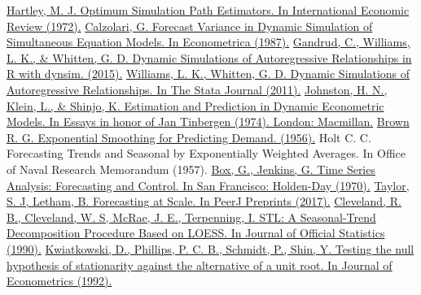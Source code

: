 \documentclass[a4paper,14pt]{extarticle}
\begin{document}
\begin{thebibliography}{99}
	\hypertarget{hartley72}{}
	\href{https://www.jstor.org/stable/2525851}
	{Hartley, M. J. Optimum Simulation Path Estimators. In International Economic Review (1972).}
	\hypertarget{calzolari87}{}
	\href{https://www.jstor.org/stable/1913569}
	{Calzolari, G. Forecast Variance in Dynamic Simulation of Simultaneous Equation Models. In Econometrica (1987).}
	\hypertarget{gandrud15}{}
	\href{https://mran.microsoft.com/snapshot/2015-11-17/web/packages/dynsim/vignettes/dynsim-overview.pdf}
	{Gandrud, C., Williams, L. K., \& Whitten, G. D. Dynamic Simulations of Autoregressive Relationships in R with dynsim. (2015).}
	\hypertarget{williams11}{}
	\href{http://web.missouri.edu/~williamslaro/Dynamic%20Simulations--Stata%20Journal.pdf}
	{Williams, L. K., Whitten, G. D. Dynamic Simulations of Autoregressive Relationships. In The Stata Journal (2011).}
	\hypertarget{johnston74}{}
	\href{https://link.springer.com/chapter/10.1007/978-1-349-01936-6_2}
	{Johnston, H. N., Klein, L., \& Shinjo, K. Estimation and Prediction in Dynamic Econometric Models. In Essays in honor of Jan Tinbergen (1974). London: Macmillan.}
	\hypertarget{brown56}{}
	\href{http://legacy.library.ucsf.edu/tid/dae94e00;jsessionid=104A0CEFFA31ADC2FA5E0558F69B3E1D.tobacco03}
	{Brown R. G. Exponential Smoothing for Predicting Demand. (1956).}
	\hypertarget{holt57}{}
	{Holt C. C. Forecasting Trends and Seasonal by Exponentially Weighted Averages. In Office of Naval Research Memorandum (1957).}
	\hypertarget{box70}{}
	\href{https://books.google.ru/books?hl=en&lr=&id=rNt5CgAAQBAJ&oi=fnd&pg=PR7&dq=Box+Jenkins+time+series+analysis+forecasting+and+control&ots=DK52vUm_Vz&sig=niRC2Tt2tUbjb6GQVpyfw2huG6U&redir_esc=y#v=onepage&q=Box%20Jenkins%20time%20series%20analysis%20forecasting%20and%20control&f=false}
	{Box, G., Jenkins, G. Time Series Analysis: Forecasting and Control. In San Francisco: Holden-Day (1970).}
	\hypertarget{taylor17}{}
	\href{https://peerj.com/preprints/3190/}
	{Taylor, S. J, Letham, B. Forecasting at Scale. In PeerJ Preprints (2017).}
	\hypertarget{cleveland90}{}
	\href{http://www.nniiem.ru/file/news/2016/stl-statistical-model.pdf}
	{Cleveland, R. B., Cleveland, W. S, McRae, J. E., Terpenning, I. STL: A Seasonal-Trend Decomposition Procedure Based on LOESS. In Journal of Official Statistics (1990).}
	\hypertarget{kwiatkowski92}{}
	\href{https://doi.org/10.1016%2F0304-4076%2892%2990104-Y}
	{Kwiatkowski, D., Phillips, P. C. B., Schmidt, P., Shin, Y. Testing the null hypothesis of stationarity against the alternative of a unit root. In Journal of Econometrics (1992).}
\end{thebibliography}
	
\end{document}
